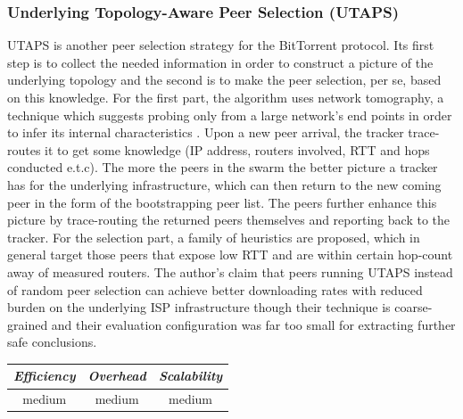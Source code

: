 \subsubsection{Underlying Topology-Aware Peer Selection (UTAPS)}
UTAPS \cite{LCY2008} is another peer selection strategy for the BitTorrent
protocol. Its first step is to collect the needed information in order to
construct a picture of the underlying topology and the second is to make the
peer selection, per se, based on this knowledge. For the first part, the
algorithm uses network tomography, a technique which suggests probing only
from a large network's end points in order to infer its internal characteristics
\cite{chny_tomography_2002}. Upon a new peer arrival, the tracker trace-routes
it to get some knowledge (IP address, routers involved, RTT and hops conducted
e.t.c). The more the peers in the swarm the better picture a tracker has for the
underlying infrastructure, which can then return to the new coming peer in the
form of the bootstrapping peer list. The peers further enhance this picture by
trace-routing the returned peers themselves and reporting back to the tracker.
For the selection part, a family of heuristics are proposed, which in general
target those peers that expose low RTT and are within certain hop-count away of
measured routers. The author's claim that peers running UTAPS instead of random
peer selection can achieve better downloading rates with reduced burden on the
underlying ISP infrastructure though their technique is coarse-grained and their
evaluation configuration was far too small for extracting further safe
conclusions.

\begin{center}
\begin{tabular}{ccc}
\emph{Efficiency} & \emph{Overhead} & \emph{Scalability} \\
\hline
medium &
medium &
%
medium
\end{tabular}
\end{center}

